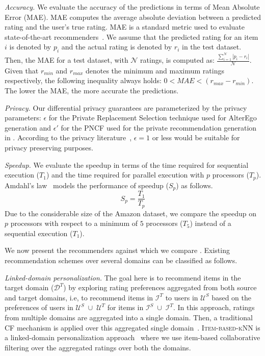 {\it Accuracy.} We evaluate the accuracy of the predictions in terms of Mean Absolute Error (MAE). MAE computes the average absolute deviation between a predicted rating and the user's true rating. MAE is a standard metric used to evaluate state-of-the-art recommenders~\cite{breese1998empirical, herlocker1999algorithmic, shardanand1995social}. We assume that the predicted rating for an item $i$ is denoted by $p_i$ and the actual rating is denoted by $r_i$ in the test dataset. Then, the MAE for a test dataset, with $\mathcal{N}$ ratings, is computed as: $\frac{\sum _{i=1}^{\mathcal{N}}|p_i -r_i|}{\mathcal{N}}$. Given that $r_{min}$ and $r_{max}$ denotes the minimum and maximum ratings respectively, the following inequality always holds: $0< MAE < (r_{max}-r_{min})$. The lower the MAE, the more accurate the predictions.


{\it Privacy.} 
Our differential privacy guarantees are parameterized by the privacy parameters: $\epsilon$ for the Private Replacement Selection technique used for AlterEgo generation and $\epsilon'$ for the PNCF used for the private recommendation generation in \crossrec. According to the privacy literature~\cite{dwork2011firm, zhu2013differential,zhu2014effective}, $\epsilon=1$ or less would be suitable for privacy preserving purposes.

{\it Speedup.} We evaluate the speedup in terms of the time required for sequential execution ($T_1$) and the time required for parallel execution with $p$ processors ($T_p$). Amdahl's law~\cite{krishnaprasad2001uses} models the performance of speedup ($S_p$) as follows.
$$
S_p= \frac{T_1}{T_p}
$$
Due to the considerable size of the Amazon dataset, we compare the speedup on $p$ processors with respect to a minimum of $5$ processors ($T_5$) instead of a sequential execution ($T_1$).

We now present the recommenders against which we compare \crossrec. Existing recommendation schemes over several domains can be classified as follows.

{\it Linked-domain personalization.} The goal here is to recommend items in the target domain ($\mathcal{D}^T$) by exploring rating preferences aggregated from both source and target domains, i.e, to recommend items in $\mathcal{I}^T$ to users in $\mathcal{U}^S$ based on the preferences of users in $\mathcal{U}^S\; \cup \;\mathcal{U}^T$ for items in $\mathcal{I}^S \;\cup \;\mathcal{I}^T$. In this approach, ratings from multiple domains are aggregated into a single domain. Then, a traditional CF mechanism is applied over this aggregated single domain~\cite{sarwar2001item, cremonesi2011cross}. \textsc{Item-based-kNN} is a linked-domain personalization approach~\cite{sarwar2001item, cremonesi2011cross} where we use item-based collaborative filtering over the aggregated ratings over both the domains.

